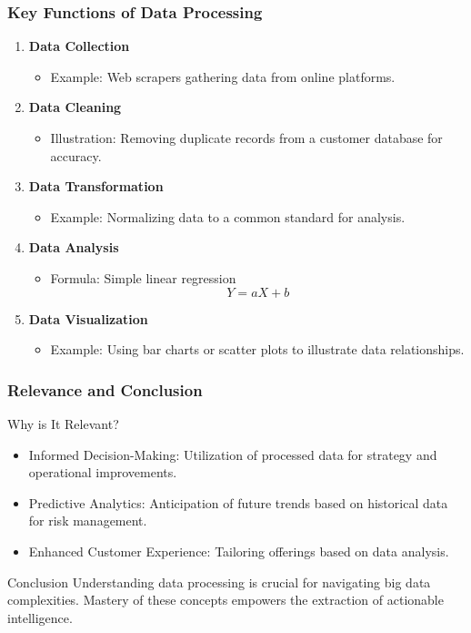 \documentclass[aspectratio=169]{beamer}
\begin{document}
\begin{frame}[fragile]
  \frametitle{Key Functions of Data Processing}
  \begin{enumerate}
    \item \textbf{Data Collection}
      \begin{itemize}
        \item Example: Web scrapers gathering data from online platforms.
      \end{itemize}
      
    \item \textbf{Data Cleaning}
      \begin{itemize}
        \item Illustration: Removing duplicate records from a customer database for accuracy.
      \end{itemize}
      
    \item \textbf{Data Transformation}
      \begin{itemize}
        \item Example: Normalizing data to a common standard for analysis.
      \end{itemize}

    \item \textbf{Data Analysis}
      \begin{itemize}
        \item Formula: Simple linear regression
        \begin{equation}
        Y = aX + b
        \end{equation}
      \end{itemize}

    \item \textbf{Data Visualization}
      \begin{itemize}
        \item Example: Using bar charts or scatter plots to illustrate data relationships.
      \end{itemize}
  \end{enumerate}
\end{frame}

\begin{frame}[fragile]
  \frametitle{Relevance and Conclusion}
  \begin{block}{Why is It Relevant?}
    \begin{itemize}
      \item Informed Decision-Making: Utilization of processed data for strategy and operational improvements.
      \item Predictive Analytics: Anticipation of future trends based on historical data for risk management.
      \item Enhanced Customer Experience: Tailoring offerings based on data analysis.
    \end{itemize}
  \end{block}
  \begin{block}{Conclusion}
    Understanding data processing is crucial for navigating big data complexities. Mastery of these concepts empowers the extraction of actionable intelligence.
  \end{block}
\end{frame}
\end{document}

